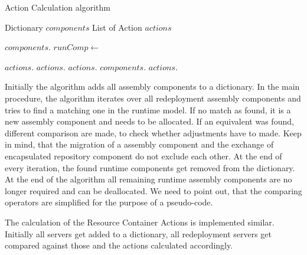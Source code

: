 \begin{algorithm}[h]
	\caption{Action Calculation algorithm}
	\label{algo:action_calc}
	\begin{algorithmic}[1]
		
		\State Dictionary $components$
		\State List of Action $actions$
		\State
		
			\State
			$components.$
			\EndFor
		\EndProcedure
		\State
		\State
		\State
			\State
				$runComp\gets $ 
				
				 \State
					$actions.$
				\Else
						\State $actions.$
					\EndIf
						\State $actions.$
					\EndIf
				\EndIf
				\State $components.$
			\EndFor
			\State
				\State $actions.$
			\EndFor
		\EndProcedure
	\end{algorithmic}
\end{algorithm}

Initially the algorithm adds all assembly components to a dictionary. In the main procedure, the algorithm iterates over all redeployment assembly components and tries to find a matching one in the runtime model. If no match as found, it is a new assembly component and needs to be allocated. If an equivalent was found, different comparison are made, to check whether adjustments have to made. Keep in mind, that the migration of a assembly component and the exchange of encapsulated repository component do not exclude each other. At the end of every iteration, the found runtime components get removed from the dictionary. At the end of the algorithm all remaining runtime assembly components are no longer required and can be deallocated. We need to point out, that the comparing operators are simplified for the purpose of a pseudo-code.

The calculation of the Resource Container Actions is implemented similar. Initially all servers get added to a dictionary, all redeployment servers get compared against those and the actions calculated accordingly.


